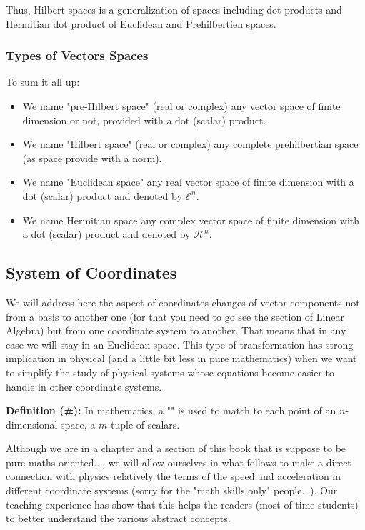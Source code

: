 	Thus, Hilbert spaces is a generalization of spaces including dot products and Hermitian dot product of Euclidean and Prehilbertien spaces.
	
	\subsubsection{Types of Vectors Spaces}
	To sum it all up:
	\begin{itemize}
		\item We name "pre-Hilbert space" (real or complex) any vector space of finite dimension or not, provided with a dot (scalar) product.
		
		\item We name "Hilbert space" (real or complex) any complete prehilbertian space (as space provide with a norm).
		
		\item We name "Euclidean space" any real vector space of finite dimension with a dot (scalar) product and denoted by $\mathcal{E}^n$.
		
		\item We name Hermitian space any complex vector space of finite dimension with a dot (scalar) product and denoted by $\mathcal{H}^n$.
	\end{itemize}
	
	\pagebreak
	\subsection{System of Coordinates}
	We will address here the aspect of coordinates changes of vector components not from a basis to another one (for that you need to go see the section of Linear Algebra) but from one coordinate system to another. That means that in any case we will stay in an Euclidean space. This type of transformation has strong implication in physical (and a little bit less in pure mathematics) when we want to simplify the study of physical systems whose equations become easier to handle in other coordinate systems.
	
	\textbf{Definition (\#\mydef):} In mathematics, a "" is used to match to each point of an $n$-dimensional space, a $m$-tuple of scalars.
	
	Although we are in a chapter and a section of this book that is suppose to be pure maths oriented..., we will allow ourselves in what follows to make a direct connection with physics relatively the terms of the speed and acceleration in different coordinate systems (sorry for the "math skills only" people...). Our teaching experience has show that this helps the readers (most of time students) to better understand the various abstract concepts.
	
